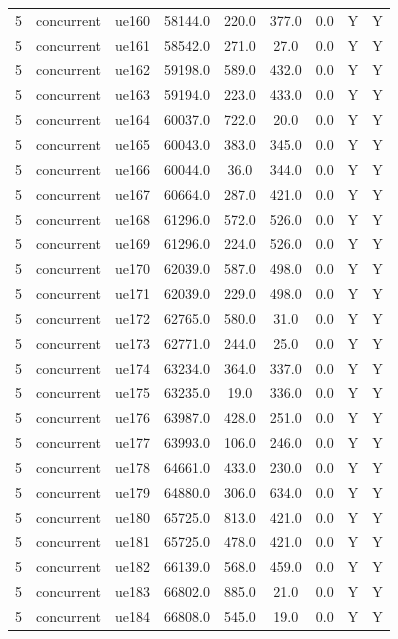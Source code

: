 \begin{table}[ht]
\begin{tabular}{|c|c|c|c|c|c|c|c|c|}
5 & concurrent & ue160 & 58144.0 & 220.0 & 377.0 & 0.0 & Y & Y \\
5 & concurrent & ue161 & 58542.0 & 271.0 & 27.0 & 0.0 & Y & Y \\
5 & concurrent & ue162 & 59198.0 & 589.0 & 432.0 & 0.0 & Y & Y \\
5 & concurrent & ue163 & 59194.0 & 223.0 & 433.0 & 0.0 & Y & Y \\
5 & concurrent & ue164 & 60037.0 & 722.0 & 20.0 & 0.0 & Y & Y \\
5 & concurrent & ue165 & 60043.0 & 383.0 & 345.0 & 0.0 & Y & Y \\
5 & concurrent & ue166 & 60044.0 & 36.0 & 344.0 & 0.0 & Y & Y \\
5 & concurrent & ue167 & 60664.0 & 287.0 & 421.0 & 0.0 & Y & Y \\
5 & concurrent & ue168 & 61296.0 & 572.0 & 526.0 & 0.0 & Y & Y \\
5 & concurrent & ue169 & 61296.0 & 224.0 & 526.0 & 0.0 & Y & Y \\
5 & concurrent & ue170 & 62039.0 & 587.0 & 498.0 & 0.0 & Y & Y \\
5 & concurrent & ue171 & 62039.0 & 229.0 & 498.0 & 0.0 & Y & Y \\
5 & concurrent & ue172 & 62765.0 & 580.0 & 31.0 & 0.0 & Y & Y \\
5 & concurrent & ue173 & 62771.0 & 244.0 & 25.0 & 0.0 & Y & Y \\
5 & concurrent & ue174 & 63234.0 & 364.0 & 337.0 & 0.0 & Y & Y \\
5 & concurrent & ue175 & 63235.0 & 19.0 & 336.0 & 0.0 & Y & Y \\
5 & concurrent & ue176 & 63987.0 & 428.0 & 251.0 & 0.0 & Y & Y \\
5 & concurrent & ue177 & 63993.0 & 106.0 & 246.0 & 0.0 & Y & Y \\
5 & concurrent & ue178 & 64661.0 & 433.0 & 230.0 & 0.0 & Y & Y \\
5 & concurrent & ue179 & 64880.0 & 306.0 & 634.0 & 0.0 & Y & Y \\
5 & concurrent & ue180 & 65725.0 & 813.0 & 421.0 & 0.0 & Y & Y \\
5 & concurrent & ue181 & 65725.0 & 478.0 & 421.0 & 0.0 & Y & Y \\
5 & concurrent & ue182 & 66139.0 & 568.0 & 459.0 & 0.0 & Y & Y \\
5 & concurrent & ue183 & 66802.0 & 885.0 & 21.0 & 0.0 & Y & Y \\
5 & concurrent & ue184 & 66808.0 & 545.0 & 19.0 & 0.0 & Y & Y \\

\end{tabular}
\end{table}

